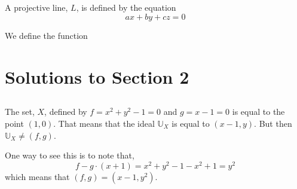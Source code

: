 \documentclass{article}
\begin{document}
\subsection{}

\subsection{}

\subsection{}

\subsection{}

\subsection{}
A projective line, \(L\), is defined by the equation
\begin{equation}
ax + by + cz = 0
\end{equation}

We define the function

\section{Solutions to Section 2}

\subsection{}
The set, \(X\), defined by \(f = x^{2} + y^{2} - 1 = 0\) and \(g = x -1=0\) is equal to the point \((1, 0)\). That means that the ideal \(\mathbb{U}_{X}\) is equal to \((x-1, y)\). But then \(\mathbb{U}_{X} \neq (f, g)\).

One way to see this is to note that,
\begin{equation}
f - g\cdot(x+1) = x^{2} + y^{2} - 1 - x^{2} + 1 = y^{2}
\end{equation}
which means that \((f, g) = (x-1, y^{2})\).
\end{document}
